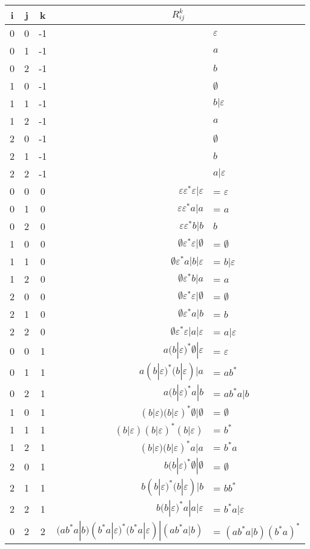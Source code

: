 \documentclass[10pt,\jkfside,a4paper]{article}
\begin{document}
\begin{enumerate}
\begin{center}
\begin{tabular}{c|c|c|r l}
i & j & k & \multicolumn{2}{c}{$R^k_{ij}$} \\
\hline
0 & 0 & -1 & & $\varepsilon$ \\
0 & 1 & -1 & & $a$ \\
0 & 2 & -1 & & $b$ \\
1 & 0 & -1 & & $\emptyset$ \\
1 & 1 & -1 & & $b|\varepsilon$ \\
1 & 2 & -1 & & $a$ \\
2 & 0 & -1 & & $\emptyset$ \\
2 & 1 & -1 & & $b$ \\
2 & 2 & -1 & & $a|\varepsilon$ \\
0 & 0 & 0 & $\varepsilon\varepsilon^*\varepsilon|\varepsilon$ &= $\varepsilon$ \\
0 & 1 & 0 & $\varepsilon\varepsilon^*a|a$ &= $a$ \\
0 & 2 & 0 & $\varepsilon\varepsilon^*b|b$ & $b$ \\
1 & 0 & 0 & $\emptyset\varepsilon^*\varepsilon|\emptyset$ &= $\emptyset$ \\
1 & 1 & 0 & $\emptyset\varepsilon^*a|b|\varepsilon$ &= $b|\varepsilon$ \\
1 & 2 & 0 & $\emptyset\varepsilon^*b|a$ &= $a$ \\
2 & 0 & 0 & $\emptyset\varepsilon^*\varepsilon|\emptyset$ &= $\emptyset$ \\
2 & 1 & 0 & $\emptyset\varepsilon^*a|b$ &= $b$ \\
2 & 2 & 0 & $\emptyset\varepsilon^*\varepsilon|a|\varepsilon$ &= $a|\varepsilon$ \\
0 & 0 & 1 & $a(b|\varepsilon)^*\emptyset|\varepsilon$ &= $\varepsilon$ \\
0 & 1 & 1 & $a(b|\varepsilon)^*(b|\varepsilon)|a$ &= $ab^*$ \\
0 & 2 & 1 & $a(b|\varepsilon)^*a|b$ &= $ab^*a|b$ \\
1 & 0 & 1 & $(b|\varepsilon)(b|\varepsilon)^*\emptyset|\emptyset$ &= $\emptyset$ \\
1 & 1 & 1 & $(b|\varepsilon)(b|\varepsilon)^*(b|\varepsilon)$ &= $b^*$ \\
1 & 2 & 1 & $(b|\varepsilon)(b|\varepsilon)^*a|a$ &= $b^*a$ \\
2 & 0 & 1 & $b(b|\varepsilon)^*\emptyset|\emptyset$ &= $\emptyset$ \\
2 & 1 & 1 & $b(b|\varepsilon)^*(b|\varepsilon)|b$ &= $bb^*$ \\
2 & 2 & 1 & $b(b|\varepsilon)^*a|a|\varepsilon$ &= $b^*a|\varepsilon$ \\
0 & 2 & 2 & $(ab^*a|b)(b^*a|\varepsilon)^*(b^*a|\varepsilon)|(ab^*a|b)$ &= $(ab^*a|b)(b^*a)^*$ \\
\end{tabular}
\end{center}


\end{enumerate}
\end{document}
